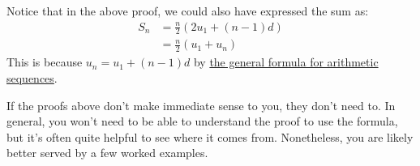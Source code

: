 \begin{remark}
	Notice that in the above proof, we could also have expressed the sum as:
	\begin{align*}
		S_n &= \frac{n}{2}(2u_1 + (n-1)d) \\
		&= \frac{n}{2}(u_1 + u_n)
	\end{align*}
	This is because $u_n = u_1 + (n-1)d$ by \hyperref[prop:arithmetic-general-formula]{the general formula for arithmetic sequences}.
\end{remark}

If the proofs above don't make immediate sense to you, they don't need to. In general, you won't need
to be able to understand the proof to use the formula, but it's often quite helpful to see where it comes from. 
Nonetheless, you are likely better served by a few worked examples. 

